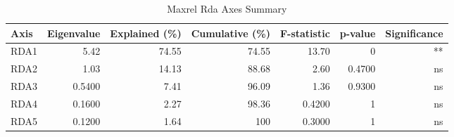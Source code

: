 \begin{table}[htbp]
  \centering
  \caption{Maxrel Rda Axes Summary}
  \label{tab:ref_threshold_sensitivity_MaxRel_rda_axes_summary}
  \small
  \begin{tabular}{lrrrrrr}
    \toprule
    Axis & Eigenvalue & Explained (\%) & Cumulative (\%) & F-statistic & p-value & Significance \\
    \midrule
    RDA1 & 5.42 & 74.55 & 74.55 & 13.70 & 0 & ** \\
    RDA2 & 1.03 & 14.13 & 88.68 & 2.60 & 0.4700 & ns \\
    RDA3 & 0.5400 & 7.41 & 96.09 & 1.36 & 0.9300 & ns \\
    RDA4 & 0.1600 & 2.27 & 98.36 & 0.4200 & 1 & ns \\
    RDA5 & 0.1200 & 1.64 & 100 & 0.3000 & 1 & ns \\
    \bottomrule
  \end{tabular}
\end{table}
